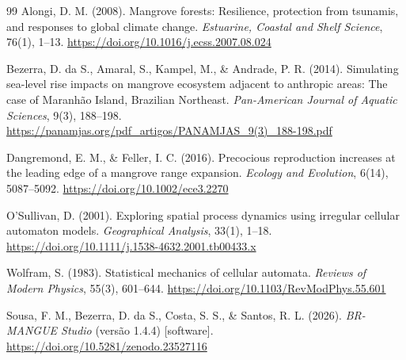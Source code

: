 \documentclass[11pt,a4paper]{article}
\begin{document}
\begin{thebibliography}{99}
Alongi, D. M. (2008).
Mangrove forests: Resilience, protection from tsunamis, and responses to global climate change.
\textit{Estuarine, Coastal and Shelf Science}, 76(1), 1--13.
\url{https://doi.org/10.1016/j.ecss.2007.08.024}

Bezerra, D. da S., Amaral, S., Kampel, M., \& Andrade, P. R. (2014).
Simulating sea-level rise impacts on mangrove ecosystem adjacent to anthropic areas: The case of Maranhão Island, Brazilian Northeast.
\textit{Pan-American Journal of Aquatic Sciences}, 9(3), 188--198.
\url{https://panamjas.org/pdf_artigos/PANAMJAS_9(3)_188-198.pdf}

Dangremond, E. M., \& Feller, I. C. (2016).
Precocious reproduction increases at the leading edge of a mangrove range expansion.
\textit{Ecology and Evolution}, 6(14), 5087--5092.
\url{https://doi.org/10.1002/ece3.2270}

O'Sullivan, D. (2001).
Exploring spatial process dynamics using irregular cellular automaton models.
\textit{Geographical Analysis}, 33(1), 1--18.
\url{https://doi.org/10.1111/j.1538-4632.2001.tb00433.x}

Wolfram, S. (1983).
Statistical mechanics of cellular automata.
\textit{Reviews of Modern Physics}, 55(3), 601--644.
\url{https://doi.org/10.1103/RevModPhys.55.601}

Sousa, F. M., Bezerra, D. da S., Costa, S. S., \& Santos, R. L. (2026).
\textit{BR-MANGUE Studio} (versão 1.4.4) [software].
\url{https://doi.org/10.5281/zenodo.23527116}
\end{thebibliography}
\end{document}
